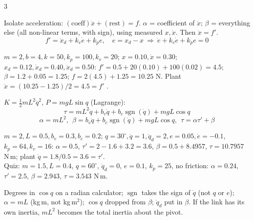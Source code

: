 \begin{multicols}{3}
\begin{fbx}[$f=\alpha f'+\beta$ \pg{10}]
Isolate acceleration: $(\text{coeff})\ddot x+(\text{rest})=f$. $\alpha$ = coefficient of $\ddot x$; $\beta$ = everything else (all non-linear terms, with sign), using measured $x,\dot x$. Then $\ddot x=f'$.
\[f'=\ddot x_d+k_v\dot e+k_pe,\quad e=x_d-x\ \Rightarrow\ \ddot e+k_v\dot e+k_pe=0\]
\end{fbx}
\begin{worked}
$m=2,b=4,k=50,k_p=100,k_v=20$; $x=0.10,\dot x=0.30$; $x_d=0.12,\dot x_d=0.40,\ddot x_d=0.50$: $f'=0.5+20(0.10)+100(0.02)=4.5$; $\beta=1.2+0.05=1.25$; $f=2(4.5)+1.25=10.25$ N. Plant $\ddot x=(10.25-1.25)/2=4.5=f'$ \checkmark. \chk
\end{worked}

\begin{fbx}
$K=\tfrac12mL^2\dot q^2$, $P=mgL\sin q$ (Lagrange):
\[\tau=mL^2\ddot q+b_v\dot q+b_c\operatorname{sgn}(\dot q)+mgL\cos q\]
\[\alpha=mL^2,\ \ \beta=b_v\dot q+b_c\operatorname{sgn}(\dot q)+mgL\cos q,\ \ \tau=\alpha\tau'+\beta\]
\end{fbx}
\begin{worked}
$m=2,L=0.5,b_v=0.3,b_c=0.2$; $q=30^\circ,\dot q=1,\ddot q_d=2,e=0.05,\dot e=-0.1$, $k_p=64,k_v=16$: $\alpha=0.5$, $\tau'=2-1.6+3.2=3.6$, $\beta=0.5+8.4957$, $\tau=10.7957$ N\,m; plant $\ddot q=1.8/0.5=3.6=\tau'$. \chk\\
Quiz: $m=1.5,L=0.4$, $q=60^\circ$, $\ddot q_d=0$, $e=0.1$, $k_p=25$, no friction: $\alpha=0.24$, $\tau'=2.5$, $\beta=2.943$, $\tau=3.543$ N\,m. \chk
\end{worked}
\begin{trap}
Degrees in $\cos q$ on a radian calculator; $\operatorname{sgn}$ takes the sign of $\dot q$ (not $q$ or $e$); $\alpha=mL$ (kg\,m, not kg\,m$^2$); $\cos q$ dropped from $\beta$; $\ddot q_d$ put in $\beta$. If the link has its own inertia, $mL^2$ becomes the total inertia about the pivot.
\end{trap}


\end{multicols}
